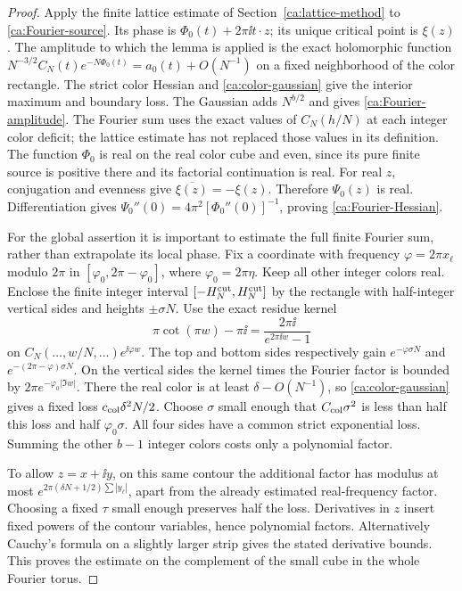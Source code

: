 \begin{proof}
Apply the finite lattice estimate of Section~\ref{ca:lattice-method}
to \eqref{ca:Fourier-source}. Its phase is
$\Phi_0(t)+2\pi\ii t\cdot z$; its unique critical point is $\xi(z)$.
The amplitude to which the lemma is applied is the exact holomorphic
function $N^{-3/2}C_N(t)e^{-N\Phi_0(t)}=a_0(t)+O(N^{-1})$
on a fixed neighborhood of the color rectangle.
The strict color Hessian and \eqref{ca:color-gaussian} give the
interior maximum and boundary loss. The Gaussian adds $N^{b/2}$
and gives \eqref{ca:Fourier-amplitude}.
The Fourier sum uses the exact values of $C_N(h/N)$ at each
integer color deficit; the lattice estimate has not replaced those
values in its definition. The function
$\Phi_0$ is real on the real color cube and even, since its pure finite source is positive there and its factorial continuation is real.
For real $z$, conjugation and evenness give
$\overline{\xi(z)}=-\xi(z)$. Therefore $\Psi_0(z)$ is real.
Differentiation gives
$\Psi_0''(0)=4\pi^2[\Phi_0''(0)]^{-1}$, proving
\eqref{ca:Fourier-Hessian}.

For the global assertion it is important to estimate the full finite Fourier sum, rather than extrapolate its local phase. Fix a coordinate with frequency
$\varphi=2\pi x_\ell$ modulo $2\pi$ in
$[\varphi_0,2\pi-\varphi_0]$, where $\varphi_0=2\pi\eta$.
Keep all other integer colors real. Enclose the finite integer interval
$[-H_N^{\rm cut},H_N^{\rm cut}]$ by the rectangle with half-integer vertical sides and heights $\pm\sigma N$. Use the exact residue kernel
\[
 \pi\cot(\pi w)-\pi\ii
     =\frac{2\pi\ii}{e^{2\pi\ii w}-1}
\]
on $C_N(\ldots,w/N,\ldots)e^{\ii\varphi w}$.
The top and bottom sides respectively gain
$e^{-\varphi\sigma N}$ and
$e^{-(2\pi-\varphi)\sigma N}$.
On the vertical sides the kernel times the Fourier factor is bounded by
$2\pi e^{-\varphi_0|\Im w|}$. There the real color is at least
$\delta-O(N^{-1})$, so \eqref{ca:color-gaussian} gives a fixed loss
$c_{\rm col}\delta^2N/2$. Choose $\sigma$ small enough that
$C_{\rm col}\sigma^2$ is less than half this loss and half
$\varphi_0\sigma$. All four sides have a common strict exponential loss. Summing the other $b-1$ integer colors costs only a polynomial factor.

To allow $z=x+\ii y$, on this same contour the additional factor has modulus at most
$e^{2\pi(\delta N+1/2)\sum|y_\ell|}$, apart from the already estimated real-frequency factor. Choosing a fixed $\tau$ small enough preserves half the loss. Derivatives in $z$ insert fixed powers of the contour variables, hence polynomial factors. Alternatively Cauchy's formula on a slightly larger strip gives the stated derivative bounds. This proves the estimate on the complement of the small cube in the
whole Fourier torus.
\end{proof}

